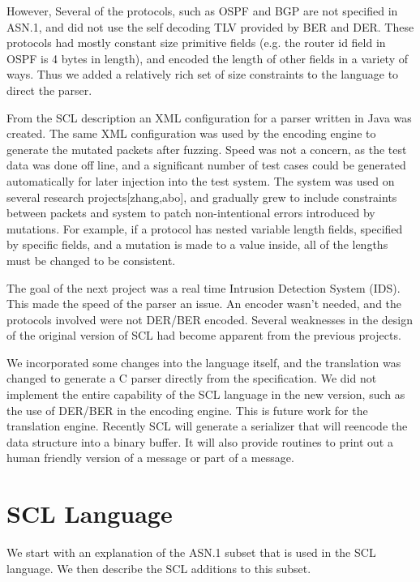 \documentclass[12pt,oneside,letterpaper]{article}
\begin{document}
However, Several of the protocols, such as OSPF\cite{OSPF} and BGP\cite{BGP} are not specified in ASN.1, and did not use the self decoding TLV provided by BER and DER. These protocols had mostly constant size primitive fields (e.g. the router id field in OSPF is 4 bytes in length), and encoded the length of other fields in a variety of ways. Thus we added a relatively rich set of size constraints to the language to direct the parser.

From the SCL description an XML configuration for a parser written in Java was created. The same XML configuration was used by the encoding engine to generate the mutated packets after fuzzing. Speed was not a concern, as the test data was done off line, and a significant number of test cases could be generated automatically for later injection into the test system. The system was used on several research projects[zhang,abo], and gradually grew to include constraints between packets and system to patch non-intentional errors introduced by mutations. For example, if a protocol has nested variable length fields, specified by specific fields, and a mutation is made to a value inside, all of the lengths must be changed to be consistent.

The goal of the next project was a real time Intrusion Detection System (IDS). This made the speed of the parser an issue. An encoder wasn't needed, and the protocols involved were not DER/BER encoded. Several weaknesses in the design of the original version of SCL had become apparent from the previous projects. 

We incorporated some changes into the language itself, and the translation was changed to generate a C parser directly from the specification. We did not implement the entire capability of the SCL language in the new version, such as the use of DER/BER in the encoding engine. This is future work for the translation engine.  Recently SCL will generate a serializer that will reencode the data structure into a binary buffer. It will also provide routines to print out a human friendly version of a message or part of a message.
 
\section{SCL Language}

We start with an explanation of the ASN.1 subset that is used in the SCL language. We then describe the SCL additions to this subset.
\end{document}
